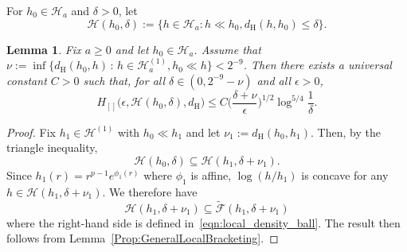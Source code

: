 \documentclass[a4paper,12pt]{article}
\newtheorem{lemma}[theorem]{Lemma}
\begin{document}
For $h_0 \in \mathcal{H}_a$ and $\delta > 0$, let 
\[
  \mathcal{H}(h_0, \delta) := \bigl\{ h \in \mathcal{H}_a : h \ll h_0, d_{\mathrm{H}}(h,h_0) \leq \delta \bigr\}.
\]
\begin{lemma}
  \label{Prop:LocalBracketing}
  Fix $a \geq 0$ and let $h_0 \in \mathcal{H}_{a}$. Assume that $\nu := \inf \{ d_{\mathrm{H}}(h_0, h) \,:\, h \in \mathcal{H}_{a}^{(1)}, h_0 \ll h \} < 2^{-9}$. Then there exists a universal constant $C > 0$ such that, for all $\delta \in (0, 2^{-9} - \nu)$ and all $\epsilon > 0$,
  \[
    H_{[]}\bigl(\epsilon, \mathcal{H}(h_0, \delta), d_{\mathrm{H}}\bigr) \leq
    C \biggl( \frac{\delta + \nu}{\epsilon} \biggr)^{1/2} \log^{5/4} \frac{1}{\delta}.
  \]
\end{lemma}
\begin{proof}
Fix $h_1 \in \mathcal{H}^{(1)}$ with $h_0 \ll h_1$ and let $\nu_1 := d_{\mathrm{H}}(h_0, h_1)$.  Then, by the triangle inequality,
  \[
    \mathcal{H}(h_0, \delta) \subseteq \mathcal{H}(h_1, \delta + \nu_1).
  \]
Since $h_1(r) = r^{p-1} e^{\phi_1(r)}$ where $\phi_1$ is affine, $ \log (h/h_1)$ is concave for any $h \in  \mathcal{H}(h_1, \delta + \nu_1)$. We therefore have
  \[
    \mathcal{H}(h_1, \delta + \nu_1) \subseteq \tilde{\mathcal{F}}(h_1, \delta + \nu_1)
  \]
  where the right-hand side is defined in~\eqref{eqn:local_density_ball}. The result then follows from Lemma~\ref{Prop:GeneralLocalBracketing}.
\end{proof}
\end{document}

